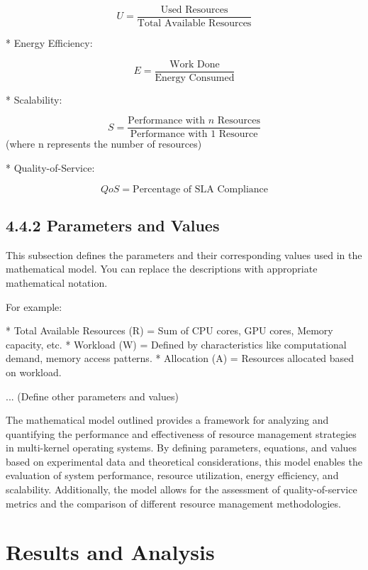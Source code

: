 \documentclass[16pt,a4paper]{article}
\begin{document}
$$U = \frac{\text{Used Resources}}{\text{Total Available Resources}}$$

* Energy Efficiency:

$$E = \frac{\text{Work Done}}{\text{Energy Consumed}}$$

* Scalability:

$$S = \frac{\text{Performance with } n \text{ Resources}}{\text{Performance with } 1 \text{ Resource}}$$ (where n represents the number of resources)

* Quality-of-Service:

$$QoS = \text{Percentage of SLA Compliance}$$

\subsection{4.4.2 Parameters and Values}

This subsection defines the parameters and their corresponding values used in the mathematical model.  You can replace the descriptions with appropriate mathematical notation.

For example:

* Total Available Resources (R) = Sum of CPU cores, GPU cores, Memory capacity, etc.
* Workload (W) = Defined by characteristics like computational demand, memory access patterns.
* Allocation (A) = Resources allocated based on workload.

... (Define other parameters and values)

The mathematical model outlined provides a framework for analyzing and quantifying the performance and effectiveness of resource management strategies in multi-kernel operating systems. By defining parameters, equations, and values based on experimental data and theoretical considerations, this model enables the evaluation of system performance, resource utilization, energy efficiency, and scalability. Additionally, the model allows for the assessment of quality-of-service metrics and the comparison of different resource management methodologies.

\clearpage

\section{Results and Analysis}
\end{document}
